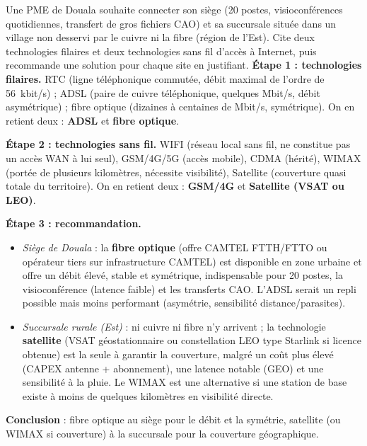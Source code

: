 \documentclass[11pt]{article}
\newcounter{popsec}
\newcounter{popsub}
\newcommand{\courssub}[1]{%
  \stepcounter{popsub}%
  \par\vspace{9pt}\noindent{\popxbold\fontsize{11.5}{13}\selectfont\color{popink}{\color{poporange}\thepopsec.\thepopsub}\hspace{6pt}#1}\par\nopagebreak\vspace{4pt}
}
\begin{document}
\begin{exoresolu}
Une PME de Douala souhaite connecter son siège (20 postes, visioconférences quotidiennes, transfert de gros fichiers CAO) et sa succursale située dans un village non desservi par le cuivre ni la fibre (région de l'Est). Cite deux technologies filaires et deux technologies sans fil d'accès à Internet, puis recommande une solution pour chaque site en justifiant.
\tcblower
\textbf{Étape 1 : technologies filaires.} RTC (ligne téléphonique commutée, débit maximal de l'ordre de \SI{56}{kbit/s}) ; ADSL (paire de cuivre téléphonique, quelques Mbit/s, débit asymétrique) ; fibre optique (dizaines à centaines de Mbit/s, symétrique). On en retient deux : \textbf{ADSL} et \textbf{fibre optique}.

\textbf{Étape 2 : technologies sans fil.} WIFI (réseau local sans fil, ne constitue pas un accès WAN à lui seul), GSM/4G/5G (accès mobile), CDMA (hérité), WIMAX (portée de plusieurs kilomètres, nécessite visibilité), Satellite (couverture quasi totale du territoire). On en retient deux : \textbf{GSM/4G} et \textbf{Satellite (VSAT ou LEO)}.

\textbf{Étape 3 : recommandation.}
\begin{itemize}
\item \emph{Siège de Douala} : la \textbf{fibre optique} (offre CAMTEL FTTH/FTTO ou opérateur tiers sur infrastructure CAMTEL) est disponible en zone urbaine et offre un débit élevé, stable et symétrique, indispensable pour 20 postes, la visioconférence (latence faible) et les transferts CAO. L'ADSL serait un repli possible mais moins performant (asymétrie, sensibilité distance/parasites).
\item \emph{Succursale rurale (Est)} : ni cuivre ni fibre n'y arrivent ; la technologie \textbf{satellite} (VSAT géostationnaire ou constellation LEO type Starlink si licence obtenue) est la seule à garantir la couverture, malgré un coût plus élevé (CAPEX antenne + abonnement), une latence notable (GEO) et une sensibilité à la pluie. Le WIMAX est une alternative si une station de base existe à moins de quelques kilomètres en visibilité directe.
\end{itemize}
\textbf{Conclusion} : fibre optique au siège pour le débit et la symétrie, satellite (ou WIMAX si couverture) à la succursale pour la couverture géographique.
\end{exoresolu}

\courssub{Les services d'Internet}
\end{document}
